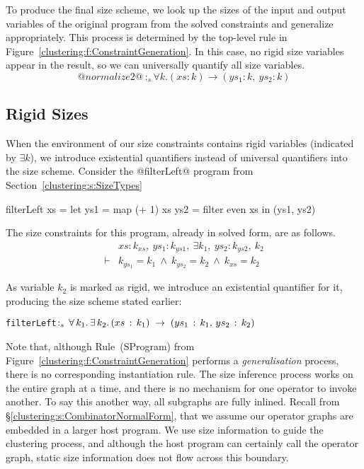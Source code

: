 To produce the final size scheme, we look up the sizes of the input and output variables of the original program from the solved constraints and generalize appropriately. This process is determined by the top-level rule in Figure~\ref{clustering:f:ConstraintGeneration}. In this case, no rigid size variables appear in the result, so we can universally quantify all size variables.
$$@normalize2@ ~:_s \forall k. (xs : k) \to (ys_1 : k,~ ys_2 : k)
$$




\subsection{Rigid Sizes}
When the environment of our size constraints contains rigid variables (indicated by $\exists k$), we introduce existential quantifiers instead of universal quantifiers into the size scheme. Consider the @filterLeft@ program from Section~\ref{clustering:s:SizeTypes}
\begin{code}
      filterLeft xs
        = let ys1 = map (+ 1)   xs
              ys2 = filter even xs
          in (ys1, ys2)
\end{code}

The size constraints for this program, already in solved form, are as follows.
$$
\begin{array}{ll}
       & xs : k_{xs},~ ys_1 : k_{ys1},~ \exists k_1,~ ys_2 : k_{ys2},~ k_2
\\
\vdash &          k_{ys_1} = k_1
        ~\wedge~  k_{ys_2} = k_2
        ~\wedge~  k_{xs}   = k_2
\end{array}
$$

As variable $k_2$ is marked as rigid, we introduce an existential quantifier for it, producing the size scheme stated earlier:

\begin{alltt}
   filterLeft \(:\sb{s}\,\forall\,k\sb{1}.\,\exists\,k\sb{2}.\,(xs\,:\,k\sb{1})\;\to\;(ys\sb{1}\,:\,k\sb{1},\,ys\sb{2}\,:\,k\sb{2})\)
\end{alltt}

Note that, although Rule~(SProgram) from Figure~\ref{clustering:f:ConstraintGeneration} performs a \emph{generalisation} process, there is no corresponding instantiation rule. The size inference process works on the entire graph at a time, and there is no mechanism for one operator to invoke another. To say this another way, all subgraphs are fully inlined. Recall from \S\ref{clustering:s:CombinatorNormalForm}, that we assume our operator graphs are embedded in a larger host program. We use size information to guide the clustering process, and although the host program can certainly call the operator graph, static size information does not flow across this boundary.

